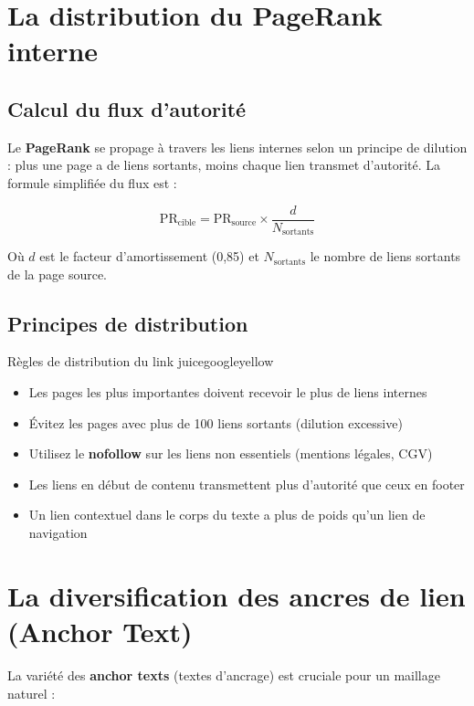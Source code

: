 \documentclass[12pt,a4paper,twoside]{report}
\newcommand{\keyword}[1]{\textbf{\textcolor{googleblue}{#1}}}
\begin{document}
\section{La distribution du PageRank interne}

\subsection{Calcul du flux d'autorité}

Le \keyword{PageRank} se propage à travers les liens internes selon un principe de dilution : plus une page a de liens sortants, moins chaque lien transmet d'autorité. La formule simplifiée du flux est :

\[
\text{PR}_{\text{cible}} = \text{PR}_{\text{source}} \times \frac{d}{N_{\text{sortants}}}
\]

Où $d$ est le facteur d'amortissement (0,85) et $N_{\text{sortants}}$ le nombre de liens sortants de la page source.

\subsection{Principes de distribution}

\begin{mybox}{Règles de distribution du link juice}{googleyellow}
\begin{itemize}
    \item Les pages les plus importantes doivent recevoir le plus de liens internes
    \item Évitez les pages avec plus de 100 liens sortants (dilution excessive)
    \item Utilisez le \keyword{nofollow} sur les liens non essentiels (mentions légales, CGV)
    \item Les liens en début de contenu transmettent plus d'autorité que ceux en footer
    \item Un lien contextuel dans le corps du texte a plus de poids qu'un lien de navigation
\end{itemize}
\end{mybox}

\section{La diversification des ancres de lien (Anchor Text)}

La variété des \keyword{anchor texts} (textes d'ancrage) est cruciale pour un maillage naturel :
\end{document}
